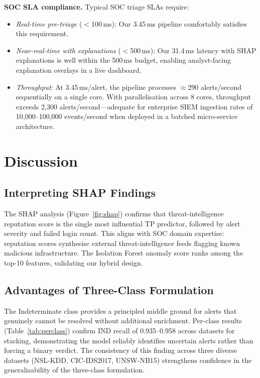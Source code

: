 \documentclass[conference]{IEEEtran}
\begin{document}
\textbf{SOC SLA compliance.}
Typical SOC triage SLAs require:
\begin{itemize}
  \item \textit{Real-time pre-triage} ($<$100\,ms): Our 3.45\,ms pipeline comfortably
    satisfies this requirement.
  \item \textit{Near-real-time with explanations} ($<$500\,ms): Our 31.4\,ms latency
    with SHAP explanations is well within the 500\,ms budget, enabling analyst-facing
    explanation overlays in a live dashboard.
  \item \textit{Throughput}: At 3.45\,ms/alert, the pipeline processes $\approx$290 alerts/second
    sequentially on a single core.  With parallelisation across 8 cores, throughput
    exceeds 2{,}300 alerts/second---adequate for enterprise SIEM ingestion rates of
    10{,}000--100{,}000 events/second when deployed in a batched micro-service architecture.
\end{itemize}

\section{Discussion}
\label{sec:discussion}

\subsection{Interpreting SHAP Findings}
The SHAP analysis (Figure~\ref{fig:shap}) confirms that threat-intelligence reputation score
is the single most influential TP predictor, followed by alert severity and failed login count.
This aligns with SOC domain expertise: reputation scores synthesise external threat-intelligence
feeds flagging known malicious infrastructure.
The Isolation Forest anomaly score ranks among the top-10 features, validating our hybrid design.

\subsection{Advantages of Three-Class Formulation}
The Indeterminate class provides a principled middle ground for alerts that genuinely cannot
be resolved without additional enrichment.
Per-class results (Table~\ref{tab:perclass}) confirm IND recall of 0.935--0.958 across
datasets for stacking, demonstrating the model reliably identifies uncertain alerts rather
than forcing a binary verdict.  The consistency of this finding across three diverse
datasets (NSL-KDD, CIC-IDS2017, UNSW-NB15) strengthens confidence in the generalisability
of the three-class formulation.
\end{document}
